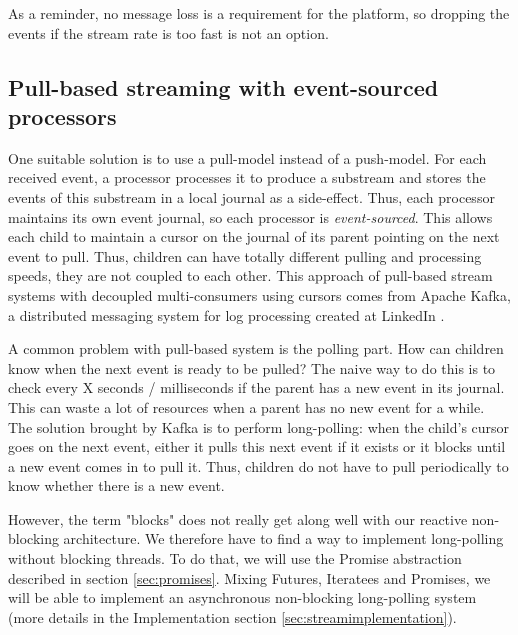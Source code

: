 As a reminder, no message loss is a requirement for the platform, so dropping the events if the stream rate is too fast is not an option.
\\

\subsection{Pull-based streaming with event-sourced processors}

One suitable solution is to use a pull-model instead of a push-model. For each received event, a processor processes it to produce a substream and stores the events of this substream in a local journal as a side-effect. Thus, each processor maintains its own event journal, so each processor is \textit{event-sourced}.
This allows each child to maintain a cursor on the journal of its parent pointing on the next event to pull. Thus, children can have totally different pulling and processing speeds, they are not coupled to each other. This approach of pull-based stream systems with decoupled multi-consumers using cursors comes from Apache Kafka, a distributed messaging system for log processing created at LinkedIn . 

A common problem with pull-based system is the polling part. How can children know when the next event is ready to be pulled? The naive way to do this is to check every X seconds / milliseconds if the parent has a new event in its journal. This can waste a lot of resources when a parent has no new event for a while. The solution brought by Kafka is to 
perform long-polling: when the child's cursor goes on the next event, either it pulls this next event if it exists or it blocks until a new event comes in to pull it. Thus, children do not have to pull periodically to know whether there is a new event.

However, the term "blocks" does not really get along well with our reactive non-blocking architecture. We therefore have to find a way to implement long-polling without blocking
threads. To do that, we will use the Promise abstraction described in section \ref{sec:promises}. Mixing Futures, Iteratees and Promises, we will be able to implement
an asynchronous non-blocking long-polling system (more details in the Implementation section \ref{sec:streamimplementation}).

